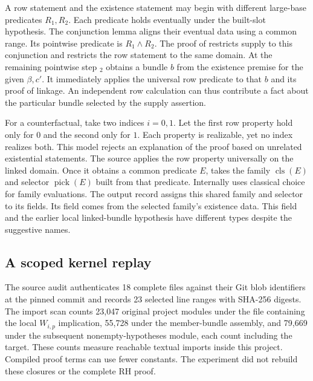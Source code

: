 \documentclass[12pt,letterpaper]{article}
\begin{document}
A row statement  and the existence statement  may begin with different large-base predicates $R_1,R_2$. Each predicate holds eventually under the built-slot hypothesis. The conjunction lemma aligns their eventual data using a common range. Its pointwise predicate is $R_1\wedge R_2$. The proof of  restricts supply to this conjunction and restricts the row statement to the same domain. At the remaining pointwise step \ensuremath{_{2}} obtains a bundle $b$ from the existence premise for the given $\beta,c'$. It immediately applies the universal row predicate to that $b$ and its proof of linkage. An independent row calculation can thus contribute a fact about the particular bundle selected by the supply assertion.  

For a counterfactual, take two indices $i=0,1$. Let the first row property hold only for $0$ and the second only for $1$. Each property is realizable, yet no index realizes both. This model rejects an explanation of the proof based on unrelated existential statements. The source applies the row property universally on the linked domain. Once it obtains a common predicate $E$,  takes the family $\operatorname{cls}(E)$ and selector $\operatorname{pick}(E)$ built from that predicate. Internally  uses classical choice for family evaluations. The output record assigns this shared family and selector to its fields. Its field  comes from the selected family's existence data. This field and the earlier local linked-bundle hypothesis have different types despite the suggestive names.   

\subsection{A scoped kernel replay}
The source audit authenticates 18 complete files against their Git blob identifiers at the pinned commit and records 23 selected line ranges with SHA-256 digests. The import scan counts 23,047 original project modules under the file containing the local $W_{i,p}$ implication, 55,728 under the member-bundle assembly, and 79,669 under the subsequent nonempty-hypotheses module, each count including the target. These counts measure reachable textual imports inside this project. Compiled proof terms can use fewer constants. The experiment did not rebuild these closures or the complete RH proof.
\end{document}
